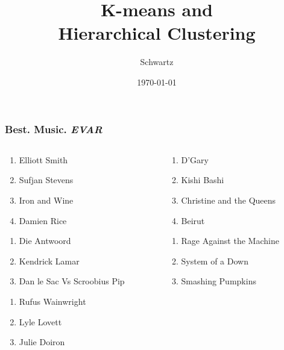 \documentclass[xcolor={dvipsnames}]{beamer}
\title{K-means and\\
Hierarchical Clustering}
\author{Schwartz}
\date{\today}
\begin{document}
\frame{\titlepage}

\frame
{
 \frametitle{Best. Music. \emph{EVAR}}

\begin{columns}
\begin{column}{.55\textwidth}

 \begin{enumerate}
 \item Elliott Smith
 \item Sufjan Stevens
 \item Iron and Wine
 \item Damien Rice
 \end{enumerate}


\begin{enumerate}
\item Die Antwoord
\item Kendrick Lamar
\item Dan le Sac Vs Scroobius Pip
 \end{enumerate}


\begin{enumerate}
 \item Rufus Wainwright
 \item Lyle Lovett
\item  Julie Doiron
 \end{enumerate}


\end{column}


\begin{column}{.55\textwidth}


 \begin{enumerate}
 \item D'Gary
 \item Kishi Bashi
 \item Christine and the Queens
 \item Beirut 
 \end{enumerate}


 \begin{enumerate}
 \item Rage Against the Machine
 \item System of a Down
 \item Smashing Pumpkins
 \end{enumerate}


\end{column}
\end{columns}}
\end{document}
